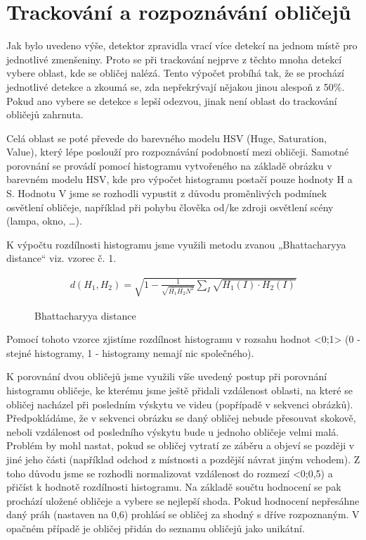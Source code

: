\documentclass[12pt,a4paper,titlepage,final]{report}
\begin{document}
\section{Trackování a rozpoznávání obličejů}

Jak bylo uvedeno výše, detektor zpravidla vrací více detekcí na jednom místě pro jednotlivé zmenšeniny. Proto se při trackování nejprve z těchto mnoha detekcí vybere oblast, kde se obličej nalézá. Tento výpočet probíhá tak, že se prochází jednotlivé detekce a zkoumá se, zda nepřekrývají nějakou jinou alespoň z 50\%. Pokud ano vybere se detekce s lepší odezvou, jinak není oblast do trackování obličejů zahrnuta.

Celá oblast se poté převede do barevného modelu HSV (Huge, Saturation, Value), který lépe poslouží pro rozpoznávání podobností mezi obličeji. Samotné porovnání se provádí pomocí histogramu vytvořeného na základě obrázku v barevném modelu HSV, kde pro výpočet histogramu postačí pouze hodnoty H a S. Hodnotu V jsme se rozhodli vypustit z důvodu proměnlivých podmínek osvětlení obličeje, například při pohybu člověka od/ke zdroji osvětlení scény (lampa, okno, \dots). 

K výpočtu rozdílnosti histogramu jsme využili metodu zvanou „Bhattacharyya distance“ viz. vzorec č. 1.

\begin{figure}

\begin{align}
d(H_{1},H_{2})=\sqrt{1-\frac{1}{\sqrt{\overline{H_{1}}\overline{H_{2}}N^2}}\sum\limits_{I}\sqrt{H_{1}(I) \cdot H_{2}(I)}}
\end{align}

\caption{Bhattacharyya distance}
\end{figure}



				
Pomocí tohoto vzorce zjistíme rozdílnost histogramu v rozsahu hodnot <0;1> (0 - stejné histogramy, 1 - histogramy nemají nic společného). 

K porovnání dvou obličejů jsme využili víše uvedený postup při porovnání histogramu obličeje, ke kterému jsme ještě přidali vzdálenost oblasti, na které se obličej nacházel při posledním výskytu ve videu (popřípadě v sekvenci obrázků). Předpokládáme, že v sekvenci obrázku se daný obličej nebude přesouvat skokově, neboli vzdálenost od posledního výskytu bude u jednoho obličeje velmi malá. Problém by mohl nastat, pokud se obličej vytratí ze záběru a objeví se později v jiné jeho části (například odchod z místnosti a pozdější návrat jiným vchodem). Z toho důvodu jsme se rozhodli normalizovat vzdálenost do rozmezí <0;0,5) a přičíst k hodnotě rozdílnosti histogramu. Na základě součtu hodnocení se pak prochází uložené obličeje a vybere se nejlepší shoda. Pokud hodnocení nepřesáhne daný práh (nastaven na 0,6) prohlásí se obličej za shodný s dříve rozpoznaným. V opačném případě je obličej přidán do seznamu obličejů jako unikátní.
\end{document}
